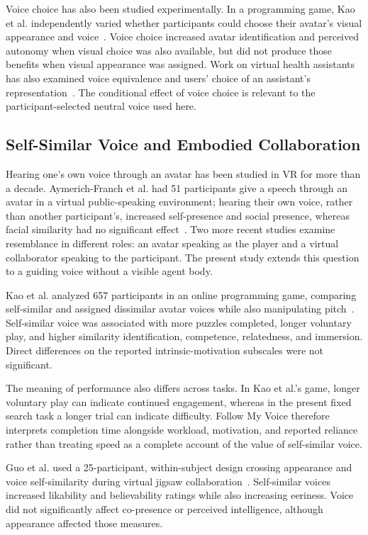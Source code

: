 Voice choice has also been studied experimentally. In a programming game, Kao et al. independently varied whether participants could choose their avatar's visual appearance and voice~\cite{kao2022audiomatters}. Voice choice increased avatar identification and perceived autonomy when visual choice was also available, but did not produce those benefits when visual appearance was assigned. Work on virtual health assistants has also examined voice equivalence and users' choice of an assistant's representation~\cite{maxim2025voicechoice}. The conditional effect of voice choice is relevant to the participant-selected neutral voice used here.

\subsection{Self-Similar Voice and Embodied Collaboration}
Hearing one's own voice through an avatar has been studied in VR for more than a decade. Aymerich-Franch et al. had 51 participants give a speech through an avatar in a virtual public-speaking environment; hearing their own voice, rather than another participant's, increased self-presence and social presence, whereas facial similarity had no significant effect~\cite{aymerich2012voicesimilarity}. Two more recent studies examine resemblance in different roles: an avatar speaking as the player and a virtual collaborator speaking to the participant. The present study extends this question to a guiding voice without a visible agent body.

Kao et al. analyzed 657 participants in an online programming game, comparing self-similar and assigned dissimilar avatar voices while also manipulating pitch~\cite{kao2021selfsimilar}. Self-similar voice was associated with more puzzles completed, longer voluntary play, and higher similarity identification, competence, relatedness, and immersion. Direct differences on the reported intrinsic-motivation subscales were not significant.

The meaning of performance also differs across tasks. In Kao et al.'s game, longer voluntary play can indicate continued engagement, whereas in the present fixed search task a longer trial can indicate difficulty. Follow My Voice therefore interprets completion time alongside workload, motivation, and reported reliance rather than treating speed as a complete account of the value of self-similar voice.

Guo et al. used a 25-participant, within-subject design crossing appearance and voice self-similarity during virtual jigsaw collaboration~\cite{guo2024doppelganger}. Self-similar voices increased likability and believability ratings while also increasing eeriness. Voice did not significantly affect co-presence or perceived intelligence, although appearance affected those measures.

